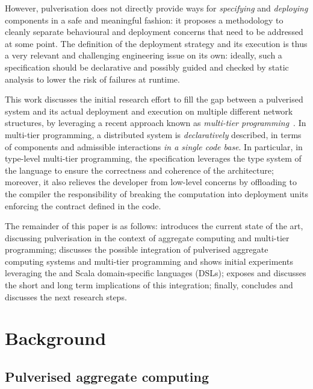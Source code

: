 However, pulverisation does not directly provide ways for \emph{specifying} and \emph{deploying} components in a safe and meaningful fashion:
it proposes a methodology to cleanly separate behavioural and deployment concerns that need to be addressed at some point.
%
The definition of the deployment strategy and its execution is thus a very relevant and challenging engineering issue on its own:
ideally, such a specification should be declarative
 and possibly guided and checked by static analysis
 to lower the risk of failures at runtime.

This work discusses the initial research effort to fill the gap between a pulverised system and its actual deployment and execution on multiple different network structures,
by leveraging a recent approach known as \emph{multi-tier programming}~\cite{DBLP:journals/csur/WeisenburgerWS20}.
%
In multi-tier programming, a distributed system is \emph{declaratively} described, in terms of components and admissible interactions \emph{in a single code base}.
%
In particular, in type-level multi-tier programming, the specification leverages the type system of the language to ensure the correctness and coherence of the architecture;
moreover, 
it also relieves the developer from low-level concerns %
by offloading to the compiler
the responsibility of breaking the computation into deployment units %
 enforcing the contract defined in the code.

The remainder of this paper is as follows:
 introduces the current state of the art, discussing pulverisation in the context of aggregate computing and multi-tier programming;
 discusses the possible integration of pulverised aggregate computing systems and multi-tier programming and shows initial experiments leveraging the \scafi{} and \scalaloci{} Scala domain-specific languages (DSLs);
 exposes and discusses the short and long term implications of this integration;
finally,
 concludes and discusses the next research steps.

\section{Background}
\label{background}
\subsection{Pulverised aggregate computing}


